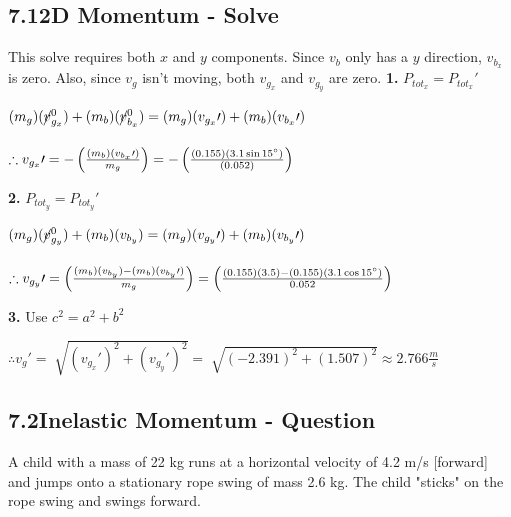 \documentclass{article}
\begin{document}
\begin{adjustwidth}{1cm}{0pt}
    \subsection*{7.1\hspace*{0.5cm}2D Momentum - Solve}
    This solve requires both $x$ and $y$ components. Since $v_{b}$ only has a $y$ direction, $v_{b_{x}}$ is zero. Also, since $v_{g}$ isn't moving, both $v_{g_{x}}$ and $v_{g_{y}}$ are zero.\newline\newline
    \textbf{1.} $P_{tot_{x}} = P_{tot_{x}}\prime$ \\
    \begin{adjustwidth}{0.6cm}{0pt}
        $(m_{g})(\cancel{v}_{g_{x}}^0) + (m_{b})(\cancel{v}_{b_{x}}^0) = (m_{g})(v_{g_{x}}\prime) + (m_{b})(v_{b_{x}}\prime)$ \\\\
        $\therefore v_{g_{x}}\prime = -\left(\frac{(m_{b})(v_{b_{x}}\prime)}{m_{g}}\right) = -\left(\frac{(0.155)(3.1\sin15\degree)}{(0.052)}\right)$
    \end{adjustwidth}\vspace*{15pt}
    \textbf{2.} $P_{tot_{y}} = P_{tot_{y}}\prime$ \\
    \begin{adjustwidth}{0.6cm}{0pt}
        $(m_{g})(\cancel{v}_{g_{y}}^0) + (m_{b})(v_{b_{y}}) = (m_{g})(v_{g_{y}}\prime) + (m_{b})(v_{b_{y}}\prime)$ \\\\
        $\therefore v_{g_{y}}\prime = \left(\frac{(m_{b})(v_{b_{y}}) - (m_{b})(v_{b_{y}}\prime)}{m_{g}}\right) = \left(\frac{(0.155)(3.5) - (0.155)(3.1\cos15\degree)}{0.052}\right)$
    \end{adjustwidth}\vspace*{15pt}
    \noindent\textbf{3.} Use $c^2 = a^2 + b^2$ \\
    \begin{adjustwidth}{0.6cm}{0pt}
        $\therefore v_{g}\prime = \sqrt[]{{(v_{g_{x}}\prime)}^2 + {(v_{g_{y}}\prime)}^2} = \sqrt[]{{(-2.391)}^2 + {(1.507)}^2} \approx 2.766 \frac{m}{s} $
    \end{adjustwidth}

    \subsection*{7.2\hspace*{0.5cm}Inelastic Momentum - Question}
    A child with a mass of 22 kg runs at a horizontal velocity of 4.2 m/s [forward] and jumps onto a stationary rope swing of mass 2.6 kg. The child "sticks" on the rope swing and swings forward.

\end{adjustwidth}
\end{document}
